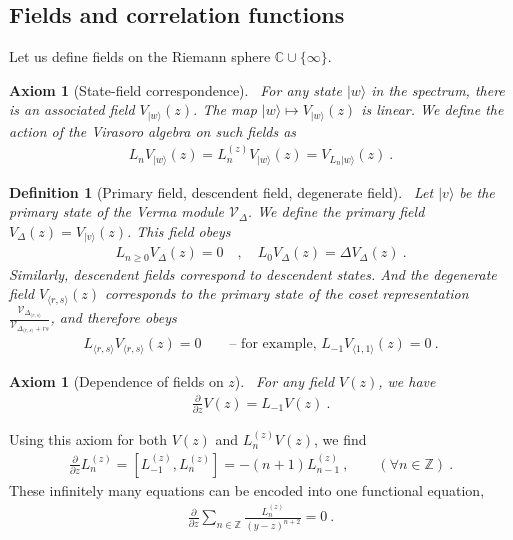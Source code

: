\documentclass[12pt, a4paper]{article}
\theoremstyle{break}
\newtheorem{hyp}[exo]{Axiom}
\newtheorem{defn}[exo]{Definition}
\begin{document}
\subsection{Fields and correlation functions}

Let us define fields on the Riemann sphere $\mathbb{C}\cup\{\infty\}$. 

\begin{hyp}[State-field correspondence]
 ~\label{hyp:sfc}
For any state $|w\rangle$ in the spectrum, there is an associated field $V_{|w\rangle}(z)$. The map $|w\rangle \mapsto V_{|w\rangle}(z)$ is linear. We define the action of the Virasoro algebra on such fields as 
\begin{align}
 L_n V_{|w\rangle}(z) =  L_n^{(z)} V_{|w\rangle}(z) = V_{L_n|w\rangle}(z)\ .
\end{align}
\end{hyp}

\begin{defn}[Primary field, descendent field, degenerate field]
~\label{def:pfdf}
Let $|v\rangle$ be the primary state of the Verma module $\mathcal V_\Delta$.
We define the primary field $V_\Delta(z)=V_{|v\rangle}(z)$. This field obeys
\begin{align}
 L_{n\geq 0} V_\Delta(z) = 0 \quad , \quad L_0 V_\Delta(z) = \Delta V_\Delta(z)\ .
\end{align}
Similarly, descendent fields correspond to descendent states. And the degenerate field $V_{\langle r,s\rangle}(z)$ corresponds to the primary state of the coset representation $\frac{ \mathcal V_{\Delta_{\langle r,s\rangle}} }{ \mathcal V_{\Delta_{\langle r,s\rangle} +rs} }$, and therefore obeys 
\begin{align}
 L_{\langle r, s\rangle} V_{\langle r,s\rangle}(z) = 0\qquad \text{-- for example, \ } L_{-1}V_{\langle 1,1\rangle}(z) = 0\ .
\end{align}
\end{defn}

\begin{hyp}[Dependence of fields on $z$]
 ~\label{hyp:geom}
 For any field $V(z)$, we have 
 \begin{align}
  \frac{\partial}{\partial z} V(z) = L_{-1} V(z)  \ .
  \label{pvlv}
 \end{align}
\end{hyp}

Using this axiom for both $V(z)$ and $L_n^{(z)}V(z)$, we find 
\begin{align}
 \frac{\partial}{\partial z} L_n^{(z)} = [L_{-1}^{(z)},L_n^{(z)}]= -(n+1)L_{n-1}^{(z)}\ ,\qquad (\forall n\in\mathbb{Z})\ .
\end{align}
These infinitely many equations can be encoded into one functional equation,
\begin{align}
 \frac{\partial}{\partial z} \sum_{n\in\mathbb{Z}} \frac{L_n^{(z)}}{(y-z)^{n+2}} = 0\ .
\end{align}
\end{document}
